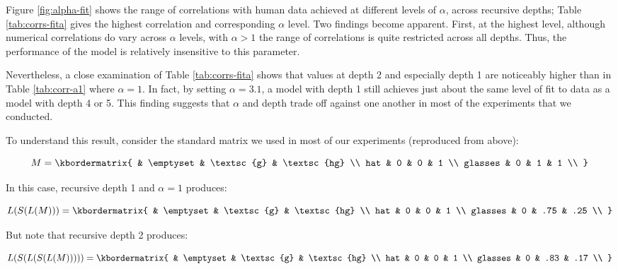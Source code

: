 \documentclass[man]{apa6}
\begin{document}
Figure \ref{fig:alpha-fit} shows the range of correlations with human data achieved at different levels of $\alpha$, across recursive depths; Table \ref{tab:corrs-fita} gives the highest correlation and corresponding $\alpha$ level. Two findings become apparent. First, at the highest level, although numerical correlations do vary across $\alpha$ levels, with $\alpha > 1$ the range of correlations is quite restricted across all depths. Thus, the performance of the model is relatively insensitive to this parameter.

Nevertheless, a close examination of Table \ref{tab:corrs-fita} shows that values at depth 2 and especially depth 1 are noticeably higher than in Table \ref{tab:corr-a1} where $\alpha=1$. In fact, by setting $\alpha=3.1$, a model with depth 1 still achieves just about the same level of fit to data as a model with depth 4 or 5. This finding suggests that $\alpha$ and depth trade off against one another in most of the experiments that we conducted.

To understand this result, consider the standard matrix we used in most of our experiments (reproduced from above):

\begin{equation}
      M = \kbordermatrix{
                 & \emptyset & \textsc{g} & \textsc{hg} \\
        hat      & 0  & 0  & 1  \\
        glasses  & 0  & 1  & 1 \\
      }
\end{equation}

\noindent In this case, recursive depth 1 and $\alpha=1$ produces:

\begin{equation}
      L(S(L(M))) = \kbordermatrix{
                 & \emptyset & \textsc{g} & \textsc{hg} \\
        hat      & 0  & 0  & 1  \\
        glasses  & 0  & .75  & .25 \\
      }
\end{equation}



\noindent But note that recursive depth 2 produces:

\begin{equation}
  L(S(L(S(L(M))))) = \kbordermatrix{
             & \emptyset & \textsc{g} & \textsc{hg} \\
    hat      & 0  & 0  & 1  \\
    glasses  & 0  & .83  & .17 \\
  }
\end{equation}
\end{document}
